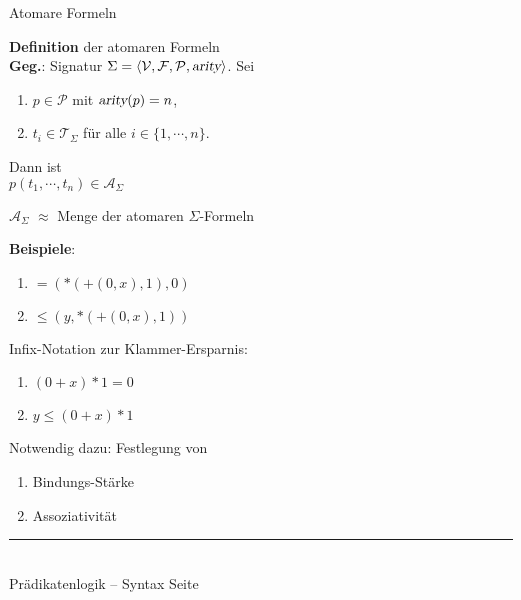 \documentclass{slides}
\newcommand{\myrule}{\rule{20cm}{1mm}\\ }
\newcounter{mypage}
\begin{document}
\begin{slide}{}
\normalsize
\begin{center}
Atomare Formeln
\end{center}
\vspace{0.5cm}

\footnotesize
\textbf{Definition} der atomaren Formeln \\[0.1cm]
\textbf{Geg.}: Signatur $\Sigma = \langle \mathcal{V}, \mathcal{F}, \mathcal{P},
\textsl{arity}\rangle$. \quad Sei
\begin{enumerate}
\item  $p \in \mathcal{P}$ \quad mit \quad $\textsl{arity}(p) = n$,
\item  $t_i \in \mathcal{T}_{\Sigma}$ \quad für alle $i\in\{1,\cdots,n\}$. 
\end{enumerate}
Dann ist \\[0.3cm]
\hspace*{1.3cm}  $p(t_1, \cdots, t_n) \in \mathcal{A}_\Sigma$ 

\begin{center}
{\normalsize
  $\mathcal{A}_\Sigma$  $\approx$ Menge der atomaren $\Sigma$-Formeln}
\end{center}

\textbf{Beispiele}:
\begin{enumerate}
\item $\mathtt{=}(\mathtt{*}(\mathtt{+}(0,x),1),0)$ 
\item $\leq(y,\mathtt{*}(\mathtt{+}(0,x),1))$ 
\end{enumerate}

Infix-Notation zur Klammer-Ersparnis:
\begin{enumerate}
\item $(0+x)*1 = 0$
\item $y \leq (0+x)*1$ 
\end{enumerate}
Notwendig dazu: Festlegung von 
\begin{enumerate}
\item Bindungs-Stärke
\item Assoziativität
\end{enumerate}

\vspace*{\fill}
\tiny \addtocounter{mypage}{1}
\myrule
Prädikatenlogik -- Syntax  \hspace*{\fill} Seite 
\end{slide}

\end{document}
